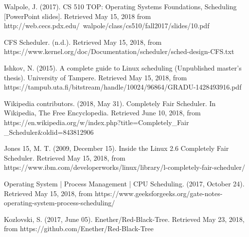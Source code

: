 \documentclass[a4paper]{article}
\begin{document}
\newpage
\begin{thebibliography}{9}
Walpole, J. (2017). CS 510 TOP: Operating Systems Foundations, Scheduling [PowerPoint slides]. Retrieved May 15, 2018 from http://web.cecs.pdx.edu/~walpole/class/cs510/fall2017/slides/10.pdf

CFS Scheduler. (n.d.). Retrieved May 15, 2018, from https://www.kernel.org/doc/Documentation/scheduler/sched-design-CFS.txt

Ishkov, N. (2015). A complete guide to Linux scheduling (Unpublished master's thesis). University of Tampere. Retrieved May 15, 2018, from https://tampub.uta.fi/bitstream/handle/10024/96864/GRADU-1428493916.pdf

Wikipedia contributors. (2018, May 31). Completely Fair Scheduler. In Wikipedia, The Free Encyclopedia. Retrieved June 10, 2018, from https://en.wikipedia.org/w/index.php?title=Completely\_Fair\\\_Scheduler\&oldid=843812906

Jones 15, M. T. (2009, December 15). Inside the Linux 2.6 Completely Fair Scheduler. Retrieved May 15, 2018, from https://www.ibm.com/developerworks/linux/library/l-completely-fair-scheduler/

Operating System | Process Management | CPU Scheduling. (2017, October 24). Retrieved May 15, 2018, from https://www.geeksforgeeks.org/gate-notes-operating-system-process-scheduling/

Kozlovski, S. (2017, June 05). Enether/Red-Black-Tree. Retrieved May 23, 2018, from https://github.com/Enether/Red-Black-Tree

\end{thebibliography}
\end{document}
